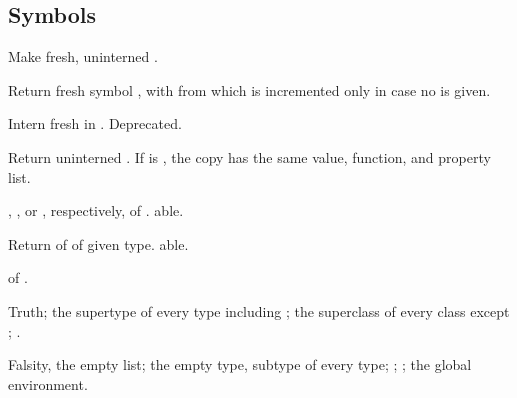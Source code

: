 \subsection{Symbols}
\begin{LIST}{1cm}

  {
  Make fresh, uninterned .
  }

  {
  Return fresh symbol , with  from
   which is incremented only in case no 
  is given. 
  }

  {
  Intern fresh  in . Deprecated.
  }

  {
  Return uninterned . If  is
  \T, the copy has the same value, function, and property list.
  }

  {
  , , or , respectively,
  of . able. 
  }

  {
  Return  of  of given
  type. able. 
  }

  {
   of .
  }

  {
  Truth; the supertype of every type including ; the superclass of every
  class except ; .
  }

  {
  Falsity, the empty list; the empty type, subtype of every type; ;
  ; the global environment.
  }

\end{LIST}


